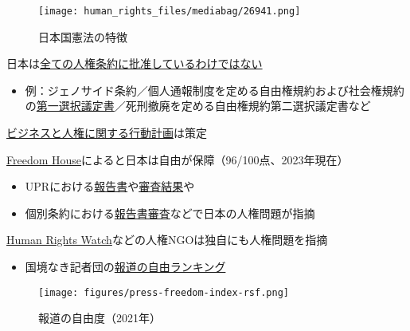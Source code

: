 \documentclass[
  xelatex,
  ja=standard]{bxjsarticle}
\providecommand{\tightlist}{%
  \setlength{\itemsep}{0pt}\setlength{\parskip}{0pt}}\usepackage{longtable,booktabs,array}
\begin{document}
\begin{figure}[htpb]

{\centering \texttt{[image: human\_rights\_files/mediabag/26941.png]}

}

\caption{日本国憲法の特徴}

\end{figure}

日本は\href{https://www.hurights.or.jp/archives/treaty/un-treaty-list.html}{全ての人権条約に批准しているわけではない}

\begin{itemize}
\tightlist
\item
  例：ジェノサイド条約／個人通報制度を定める自由権規約および社会権規約の\href{https://www.nichibenren.or.jp/activity/international/library/human_rights/liberty_protocols_no1.html}{第一選択議定書}／死刑撤廃を定める自由権規約第二選択議定書など
\end{itemize}

\href{https://www.mofa.go.jp/mofaj/gaiko/bhr/index.html}{ビジネスと人権に関する行動計画}は策定

\href{https://freedomhouse.org/country/japan/freedom-world/2023}{Freedom
House}によると日本は自由が保障（96/100点、2023年現在）

\begin{itemize}
\tightlist
\item
  UPRにおける\href{https://www.nichibenren.or.jp/activity/international/library/upr.html}{報告書}や\href{https://www.mofa.go.jp/mofaj/gaiko/jinken_r/upr_gai.html}{審査結果}や
\item
  個別条約における\href{https://www.nichibenren.or.jp/activity/international/library/human_rights.html}{報告書審査}などで日本の人権問題が指摘
\end{itemize}

\href{https://www.hrw.org/ja/asia/japan}{Human Rights
Watch}などの人権NGOは独自にも人権問題を指摘

\begin{itemize}
\tightlist
\item
  国境なき記者団の\href{https://rsf.org/en/ranking}{報道の自由ランキング}
\end{itemize}

\begin{figure}[htpb]

{\centering \texttt{[image: figures/press-freedom-index-rsf.png]}

}

\caption{報道の自由度（2021年）}

\end{figure}
\end{document}
